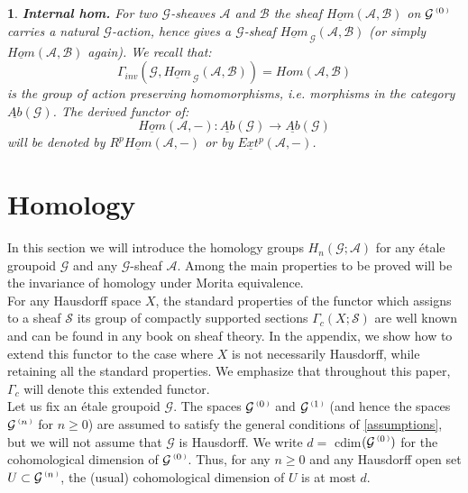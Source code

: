 \documentclass[a4paper]{article}
\newtheorem{num}[st]{}
\newcommand{\rmap}{\longrightarrow}
\newcommand{\Ha}{\ensuremath{\mathcal{H}}}
\newcommand{\G}{\ensuremath{\mathcal{G}}}
\newcommand{\A}{\ensuremath{\mathcal{A}}}
\newcommand{\es}{\ensuremath{\mathcal{S}}}
\newcommand{\B}{\ensuremath{\mathcal{B}}}
\newcommand{\abG}{\ensuremath{\underline{Ab}(\G)}}
\newcommand{\ps}{{\raise 1pt\hbox{\tiny (}}}
\newcommand{\pd}{{\raise 1pt\hbox{\tiny )}}}
\newcommand{\nG}[1]{\ensuremath{\G^{\,\ps #1\,\pd}}}
\begin{document}
\begin{num}
\label{Inthom}
\emph{
{\bf Internal hom.} For two $\G$-sheaves $\A$ and $\B$ the sheaf $\underline{Hom}(\A, \B)$ on $\nG{0}$ carries a natural $\G$-action, hence gives a $\G$-sheaf $\underline{Hom}_{\, \G}(\A, \B)$ (or simply $\underline{Hom}(\A, \B)$ again). We recall that:
\[ \Gamma_{inv}(\G, \underline{Hom}_{\, \G}(\A, \B)) = Hom(\A, \B) \]
is the group of action preserving homomorphisms, i.e. morphisms in the category $\abG$. The derived functor of:
\[ \underline{Hom}(\A, -) : \abG \rmap \abG \]
will be denoted by $R^{p}\underline{Hom}(\A, -)$ or by $\underline{Ext^{p}}(\A, -)$. 
}
\end{num}



\section{Homology}


\hspace*{.3in} In this section we will introduce the homology groups $H_{n}(\G; \A)$ for any \'etale groupoid $\G$ and any $\G$-sheaf $\A$. Among the main properties to be proved will be the invariance of homology under Morita equivalence. \\
\hspace*{.3in} For any Hausdorff space $X$, the standard properties of the functor which assigns to a sheaf $\es$ its group of compactly supported sections $\Gamma_c(X; \es)$ are well known and can be found in any book on sheaf theory. In the appendix, we show how to extend this functor to the case where $X$ is not necessarily Hausdorff, while retaining all the standard properties. We emphasize that throughout this paper, $\Gamma_c$ will denote this extended functor.\\
\hspace*{.3in} Let us fix an \'etale groupoid $\G$. The spaces $\nG{0}$ and $\nG{1}$ (and hence the spaces $\nG{n}$ for $n \geq 0$) are assumed to satisfy the general conditions of \ref{assumptions}, but we will not assume that $\G$ is Hausdorff. We write $d=$ cdim$(\nG{0})$ for the cohomological dimension of $\nG{0}$. Thus, for any $n \geq 0$ and any Hausdorff open set $U \subset \nG{n}$, the (usual) cohomological dimension  of $U$ is at most $d$.
\end{document}
